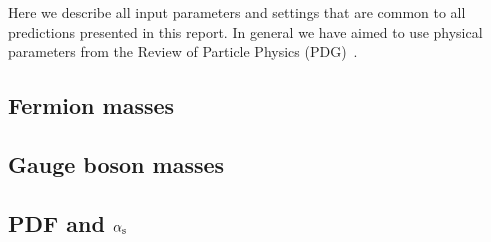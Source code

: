 Here we describe all input parameters and settings that are common to
all predictions presented in this report. In general we have aimed to use physical parameters from the Review of Particle Physics (PDG)~\cite{ParticleDataGroup:2020ssz}.
\subsection{Fermion masses}

\subsection{Gauge boson masses}

\subsection{PDF and $\alpha_{\mathrm{s}}$}
